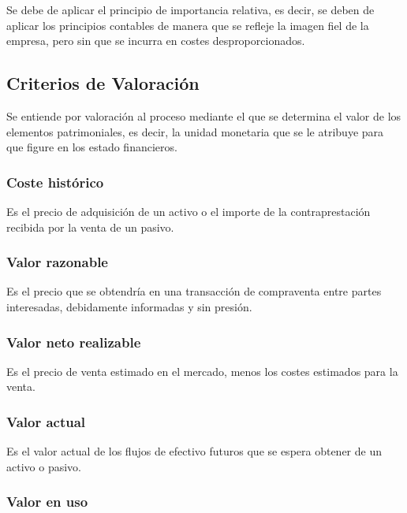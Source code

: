 \documentclass[a4paper,12pt]{article}
\begin{document}
Se debe de aplicar el principio de importancia relativa, es decir, se deben de aplicar los principios contables de manera que se refleje la imagen fiel de la empresa, pero sin que se incurra en costes desproporcionados.\\

\subsection{Criterios de Valoración}

Se entiende por valoración al proceso mediante el que se determina el valor de los elementos patrimoniales, es decir, la unidad monetaria que se le atribuye para que figure en los estado financieros.\\

\subsubsection{Coste histórico}

Es el precio de adquisición de un activo o el importe de la contraprestación recibida por la venta de un pasivo.\\

\subsubsection{Valor razonable}

Es el precio que se obtendría en una transacción de compraventa entre partes interesadas, debidamente informadas y sin presión.\\

\subsubsection{Valor neto realizable}

Es el precio de venta estimado en el mercado, menos los costes estimados para la venta.\\

\subsubsection{Valor actual}

Es el valor actual de los flujos de efectivo futuros que se espera obtener de un activo o pasivo.\\

\subsubsection{Valor en uso}
\end{document}
